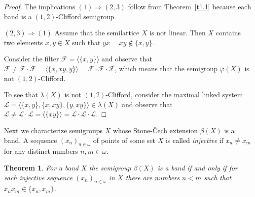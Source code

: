 \documentclass{amsart}
\newtheorem{theorem}[lem]{Theorem}
\theoremstyle{definition}
\begin{document}
\begin{proof} The implications $(1){\Rightarrow}(2,3)$ follow from Theorem~\ref{t1.1} because each band is a $(1,2)$-Clifford semigroup.
\smallskip

$(2,3){\Rightarrow}(1)$ Assume that the semilattice $X$ is not linear. Then $X$ contains two elements $x,y\in X$ such that $yx=xy\notin\{x,y\}$.

Consider the filter ${\mathcal {F}}={\langle}\{x,y\}{\rangle}$ and observe that ${\mathcal {F}}\ne{\mathcal {F}}\cdot{\mathcal {F}}={\langle}\{x,xy,y\}{\rangle}={\mathcal {F}}\cdot{\mathcal {F}}\cdot{\mathcal {F}}$, which means that the semigroup $\varphi(X)$ is not $(1,2)$-Clifford.

To see that $\lambda(X)$ is not $(1,2)$-Clifford, consider the maximal linked system
${\mathcal L}={\langle}\{x,y\},\{x,xy\},\{y,xy\}{\rangle}\in\lambda(X)$ and observe that ${\mathcal L}\ne{\mathcal L}\cdot{\mathcal L}={\langle}\{xy\}{\rangle}={\mathcal L}\cdot{\mathcal L}\cdot{\mathcal L}$.
\end{proof}

Next we characterize semigroups $X$ whose Stone-\v Cech extension $\beta(X)$ is a band. A sequence $(x_n)_{n\in{\omega}}$ of points of some set $X$ is called {\em injective} if $x_n\ne x_m$ for any distinct numbers $n,m\in{\omega}$.

\begin{theorem}
For a band  $X$ the semigroup $\beta(X)$ is a band if and
only if for each injective sequence $(x_n)_{n\in{\omega}}$ in $X$ there are numbers $n<m$ such that $x_nx_m\in\{x_n,x_m\}$.
\end{theorem}
\end{document}

